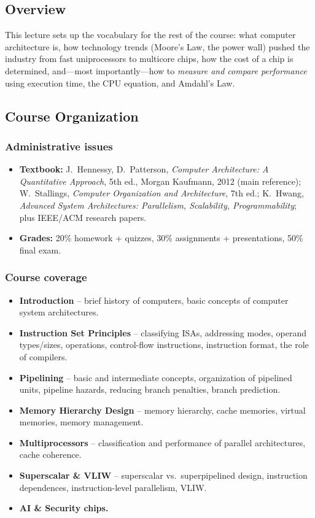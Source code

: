 
\subsection{Overview}

This lecture sets up the vocabulary for the rest of the course: what computer
architecture is, how technology trends (Moore's Law, the power wall) pushed the
industry from fast uniprocessors to multicore chips, how the cost of a chip is
determined, and---most importantly---how to \emph{measure and compare
performance} using execution time, the CPU equation, and Amdahl's Law.

\subsection{Course Organization}

\subsubsection{Administrative issues}
\begin{itemize}
  \item \textbf{Textbook:} J.~Hennessy, D.~Patterson, \emph{Computer
  Architecture: A Quantitative Approach}, 5th ed., Morgan Kaufmann, 2012
  (main reference); W.~Stallings, \emph{Computer Organization and
  Architecture}, 7th ed.; K.~Hwang, \emph{Advanced System Architectures:
  Parallelism, Scalability, Programmability}; plus IEEE/ACM research papers.
  \item \textbf{Grades:} 20\% homework + quizzes, 30\% assignments +
  presentations, 50\% final exam.
\end{itemize}

\subsubsection{Course coverage}
\begin{itemize}
  \item \textbf{Introduction} -- brief history of computers, basic concepts
  of computer system architectures.
  \item \textbf{Instruction Set Principles} -- classifying ISAs, addressing
  modes, operand types/sizes, operations, control-flow instructions,
  instruction format, the role of compilers.
  \item \textbf{Pipelining} -- basic and intermediate concepts, organization
  of pipelined units, pipeline hazards, reducing branch penalties, branch
  prediction.
  \item \textbf{Memory Hierarchy Design} -- memory hierarchy, cache
  memories, virtual memories, memory management.
  \item \textbf{Multiprocessors} -- classification and performance of
  parallel architectures, cache coherence.
  \item \textbf{Superscalar \& VLIW} -- superscalar vs.\ superpipelined
  design, instruction dependences, instruction-level parallelism, VLIW.
  \item \textbf{AI \& Security chips.}
\end{itemize}

